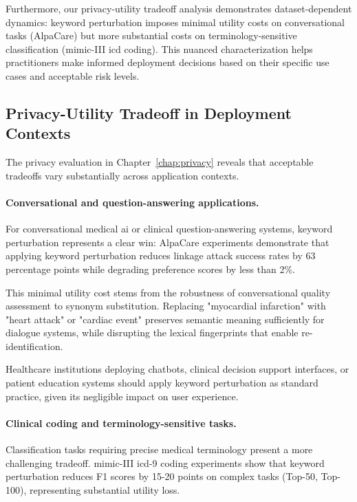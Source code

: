 Furthermore, our privacy-utility tradeoff analysis demonstrates dataset-dependent dynamics: keyword perturbation imposes minimal utility costs on conversational tasks (AlpaCare) but more substantial costs on terminology-sensitive classification (\gls{mimic}-III \gls{icd} coding).
This nuanced characterization helps practitioners make informed deployment decisions based on their specific use cases and acceptable risk levels.


\subsection{Privacy-Utility Tradeoff in Deployment Contexts}

The privacy evaluation in Chapter~\ref{chap:privacy} reveals that acceptable tradeoffs vary substantially across application contexts.

\paragraph{Conversational and question-answering applications.}

For conversational medical \gls{ai} or clinical question-answering systems, keyword perturbation represents a clear win: AlpaCare experiments demonstrate that applying keyword perturbation reduces linkage attack success rates by 63 percentage points while degrading preference scores by less than 2\%.

This minimal utility cost stems from the robustness of conversational quality assessment to synonym substitution.
Replacing "myocardial infarction" with "heart attack" or "cardiac event" preserves semantic meaning sufficiently for dialogue systems, while disrupting the lexical fingerprints that enable re-identification.

Healthcare institutions deploying chatbots, clinical decision support interfaces, or patient education systems should apply keyword perturbation as standard practice, given its negligible impact on user experience.

\paragraph{Clinical coding and terminology-sensitive tasks.}

Classification tasks requiring precise medical terminology present a more challenging tradeoff.
\gls{mimic}-III \gls{icd}-9 coding experiments show that keyword perturbation reduces F1 scores by 15-20 points on complex tasks (Top-50, Top-100), representing substantial utility loss.

